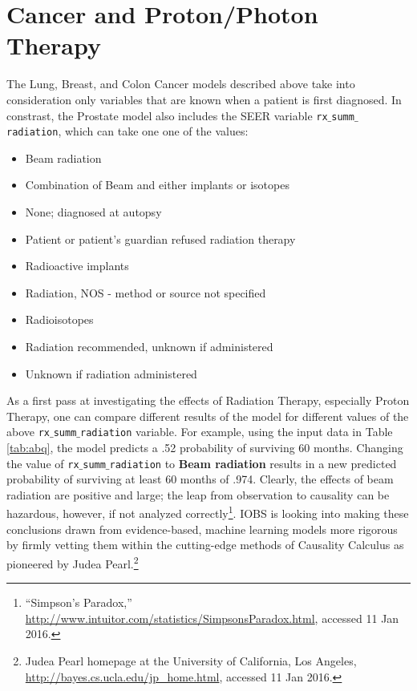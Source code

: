 \documentclass[a4paper,11pt]{article}
\newcommand{\codewhite}[1]{\colorbox{white}{\texttt{#1}}}
\begin{document}
\section{Cancer and Proton/Photon Therapy}

The Lung, Breast, and Colon Cancer models described above take into consideration only variables that are known when a patient is first diagnosed. In constrast, the Prostate model also includes the SEER variable \codewhite{rx$\_$summ$\_$radiation}, which can take one one of the values:

\begin{itemize}[noitemsep]
\item Beam radiation
\item Combination of Beam and either implants or isotopes
\item None; diagnosed at autopsy
\item Patient or patient's guardian refused radiation therapy
\item Radioactive implants
\item Radiation, NOS - method or source not specified
\item Radioisotopes
\item Radiation recommended, unknown if administered
\item Unknown if radiation administered
\end{itemize}

As a first pass at investigating the effects of Radiation Therapy, especially Proton Therapy, one can compare different results of the model for different values of the above \codewhite{rx$\_$summ$\_$radiation} variable. For example, using the input data in Table \ref{tab:abq}, the model predicts a .52 probability of surviving 60 months. Changing the value of \codewhite{rx$\_$summ$\_$radiation} to \textbf{Beam radiation} results in a new predicted probability of surviving at least 60 months of .974.
Clearly, the effects of beam radiation are positive and large; the leap from observation to causality can be hazardous, however, if not analyzed correctly\footnote{``Simpson's Paradox,'' \url{http://www.intuitor.com/statistics/SimpsonsParadox.html}, accessed 11 Jan 2016.}. IOBS is looking into making these conclusions drawn from evidence-based, machine learning models more rigorous by firmly vetting them within the cutting-edge methods of Causality Calculus as pioneered by Judea Pearl.\footnote{Judea Pearl homepage at the University of California, Los Angeles, \url{http://bayes.cs.ucla.edu/jp_home.html}, accessed 11 Jan 2016.}
\end{document}
